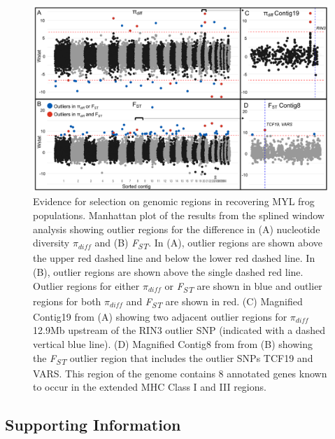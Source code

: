 \documentclass[
  letterpaper,
  DIV=11,
  numbers=noendperiod]{scrartcl}
\begin{document}
\begin{figure}

{\centering \includegraphics[width=5.72917in,height=\textheight]{figures/splinewindow_manhattan.png}

}

\caption{\label{fig-spline-manhattan}Evidence for selection on genomic
regions in recovering MYL frog populations. Manhattan plot of the
results from the splined window analysis showing outlier regions for the
difference in (A) nucleotide diversity \(\pi_{diff}\) and (B)
\emph{F\textsubscript{ST}}. In (A), outlier regions are shown above the
upper red dashed line and below the lower red dashed line. In (B),
outlier regions are shown above the single dashed red line. Outlier
regions for either \(\pi_{diff}\) or \emph{F\textsubscript{ST}} are
shown in blue and outlier regions for both \(\pi_{diff}\) and
\emph{F\textsubscript{ST}} are shown in red. (C) Magnified Contig19 from
(A) showing two adjacent outlier regions for \(\pi_{diff}\) 12.9Mb
upstream of the RIN3 outlier SNP (indicated with a dashed vertical blue
line). (D) Magnified Contig8 from from (B) showing the
\emph{F\textsubscript{ST}} outlier region that includes the outlier SNPs
TCF19 and VARS. This region of the genome contains 8 annotated genes
known to occur in the extended MHC Class I and III regions.}

\end{figure}

\newpage

\hypertarget{supporting-information}{%
\subsection{Supporting Information}\label{supporting-information}}
\end{document}
